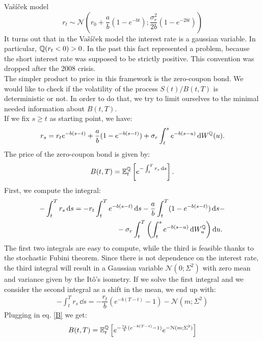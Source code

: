 \begin{example}{Vašíček model}{}{}
\begin{equation}
        r_t \sim \mathcal{N}\left(r_0 + \frac{a}{b}(1-e^{-bt});\frac{\sigma^2_r}{2b}\left(1-e^{-2bt}\right)\right)
    \end{equation}
    It turns out that in the Vašíček model the interest rate is a gaussian variable. In particular, $\mathbb{Q}(r_t<0)>0$. In the past this fact represented a problem, because the short interest rate was supposed to be strictly positive. This convention was dropped after the 2008 crisis.\\
    The simpler product to price in this framework is the zero-coupon bond. We would like to check if the volatility of the process $S(t)/B(t,T)$ is deterministic or not. In order to do that, we try to limit ourselves to the minimal needed information about $B(t,T)$. \\
    If we fix $s\ge t$ as starting point, we have:
    \begin{equation}
        r_s = r_te^{-b(s-t)} + \frac{a}{b}(1-e^{-b(s-t)}) + \sigma_r \int_t^s e^{-b(s-u)}\,\dd W^{\mathbb{Q}}(u).
    \end{equation}
    The price of the zero-coupon bond is given by:
    \begin{align}\label{B}
        B(t,T) = \mathbb{E}^{\mathbb{Q}}_t\left[e^{-\int_t^Tr_s\,\dd s}\right].
    \end{align}
    First, we compute the integral:
    \begin{align}
        \notag -\int_t^Tr_s\,\dd s &= -r_t\int_t^T e^{-b(s-t)}\,\dd s - \frac{a}{b}\int_t^T(1-e^{-b(s-t)})\,\dd s - \\
        &\qquad\qquad\qquad
        - \sigma_r\int_t^T \left(\int_t^s e^{-b(s-u)}\,\dd W^{\mathbb{Q}}_u\right)\dd u.
    \end{align}
    The first two integrals are easy to compute, while the third is feasible thanks to the stochastic Fubini theorem. Since there is not dependence on the interest rate, the third integral will result in a Gaussian variable $\mathcal{N}(0;\Sigma^2)$ with zero mean and variance given by the Itô's isometry. If we solve the first integral and we consider the second integral as a shift in the mean, we end up with:
    \begin{align}
        -\int_t^Tr_s\,\dd s = -\dfrac{r_t}{b}(e^{-b(T-t)}-1) - \mathcal{N}(m;\Sigma^2)
    \end{align}
    Plugging in eq. \eqref{B} we get:
    \begin{equation}
        B(t,T) = \mathbb{E}^{\mathbb{Q}}_t\left[e^{-\frac{r_t}{b}(e^{-b(T-t)}-1)}e^{-\mathcal{N}(m;\Sigma^2)}\right]
    \end{equation}

\end{example}
